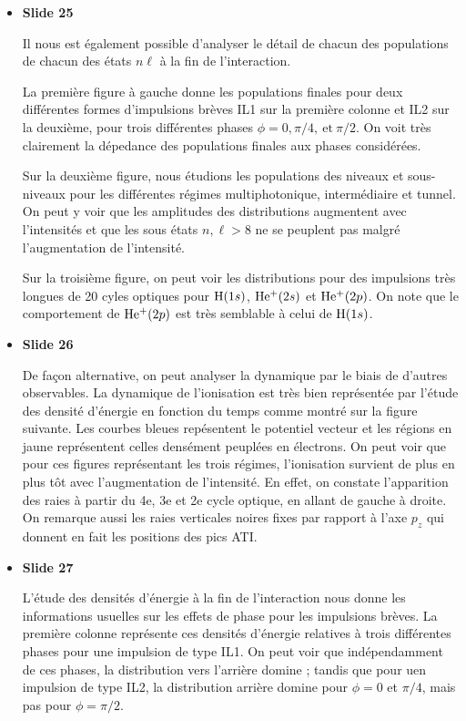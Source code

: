 \documentclass[10pt,a4paper]{article}
\begin{document}
\begin{itemize}
Ceci nous emm\`ene \`a un r\'esultat bien connu de l'interaction 
rayonnement-mati\`ere : pas d'effets de phase pour les impulsions longues.

\item \textbf{Slide 25}\par
Il nous est \'egalement possible d'analyser le d\'etail de chacun 
des populations de chacun des \'etats $n\ell$ \`a la fin de 
l'interaction.

La premi\`ere figure \`a gauche donne les populations finales 
pour deux diff\'erentes formes d'impulsions br\`eves IL1 sur la premi\`ere colonne
et IL2 sur la deuxi\`eme, pour trois diff\'erentes phases
$\phi=0,\pi/4,\ \mbox{et}\ \pi/2$.
On voit tr\`es clairement la d\'epedance des populations finales 
aux phases consid\'er\'ees.

Sur la deuxi\`eme figure, nous \'etudions les populations 
des niveaux et sous-niveaux pour les diff\'erentes r\'egimes multiphotonique,
interm\'ediaire et tunnel. On peut y voir que les amplitudes 
des distributions augmentent avec l'intensit\'es et que les sous \'etats 
$n,\ell>8$ ne se peuplent pas malgr\'e l'augmentation de l'intensit\'e. 

Sur la troisi\`eme figure, on peut voir les distributions 
pour des impulsions tr\`es longues de 20 cyles optiques pour ${\rm H}(1s)$,
${\rm He^+}(2s)$ et ${\rm He^+}(2p)$.
On note que le comportement de ${\rm He^+}(2p)$ est tr\`es semblable 
\`a celui de ${\rm H}(1s)$.
 
\item \textbf{Slide 26}\par
De fa\c con alternative, on peut analyser la dynamique par le biais de 
d'autres observables. 
La dynamique de l'ionisation est tr\`es bien repr\'esent\'ee 
par l'\'etude des densit\'e d'\'energie en fonction du temps 
comme montr\'e sur la figure suivante.
Les courbes bleues rep\'esentent le potentiel vecteur et les r\'egions
en jaune repr\'esentent celles dens\'ement peupl\'ees en \'electrons.
On peut voir que pour ces figures repr\'esentant les trois r\'egimes, 
l'ionisation survient de plus en plus t\^ot avec l'augmentation de l'intensit\'e.
En effet, on constate l'apparition des raies \`a partir du 4e, 3e et 2e cycle optique,
en allant de gauche \`a droite. 
On remarque aussi les raies verticales noires fixes par rapport \`a l'axe $p_z$
qui donnent en fait les positions des pics ATI.

\item \textbf{Slide 27}\par
L'\'etude des densit\'es d'\'energie \`a la fin de l'interaction 
nous donne les informations usuelles sur les effets de phase 
pour les impulsions br\`eves.
La premi\`ere colonne repr\'esente ces densit\'es d'\'energie 
relatives \`a trois diff\'erentes phases pour une impulsion de type IL1.
On peut voir que ind\'ependamment de ces phases, la distribution vers 
l'arri\`ere domine ; tandis que pour uen impulsion de type 
IL2, la distribution arri\`ere domine pour $\phi=0$ et $\pi/4$, 
mais pas pour $\phi=\pi/2$. 


\end{itemize}
\end{document}
